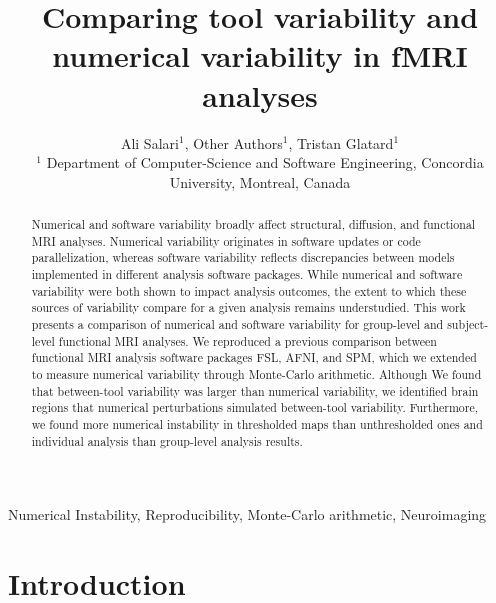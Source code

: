 \documentclass[conference]{IEEEtran}
\begin{document}
\newcommand{\fslspm}{FSL-SPM\xspace}
\newcommand{\fslafni}{FSL-AFNI\xspace}
\newcommand{\afnispm}{AFNI-SPM\xspace}
\newcommand{\tristan}[1]{\color{orange}\textbf{From Tristan:} #1\color{black}\xspace}
\newcommand{\ali}[2]{\color{green}\textbf{Ali:} #1\color{black}\xspace}
\newcommand{\discuss}[1]{\uwave{#1}}


\title{Comparing tool variability and numerical variability in fMRI analyses}

\author{Ali Salari$^1$, Other Authors$^1$, Tristan Glatard$^1$ \\
$^1$ Department of Computer-Science and Software Engineering, Concordia University, Montreal, Canada}

\maketitle
\begin{abstract}

Numerical and software variability broadly affect structural, diffusion, and functional MRI analyses. Numerical
variability originates in software updates or code
parallelization, whereas software variability reflects discrepancies between
models implemented in different analysis software packages. While numerical
and software variability were both shown to impact analysis outcomes, the
extent to which these sources of variability compare for a given
analysis remains understudied. This work presents a comparison of
numerical and software variability for group-level and subject-level functional MRI analyses.
We reproduced a previous comparison between functional MRI analysis
software packages FSL, AFNI, and SPM, which we extended to measure
numerical variability through Monte-Carlo arithmetic.
Although We found that between-tool variability was larger than numerical variability,
we identified brain regions that numerical perturbations simulated between-tool variability.
Furthermore, we found more numerical instability in thresholded maps than unthresholded ones
and individual analysis than group-level analysis results.

\end{abstract}

\begin{IEEEkeywords}
  Numerical Instability, Reproducibility, Monte-Carlo arithmetic, Neuroimaging
\end{IEEEkeywords}


\section{Introduction}
\end{document}
